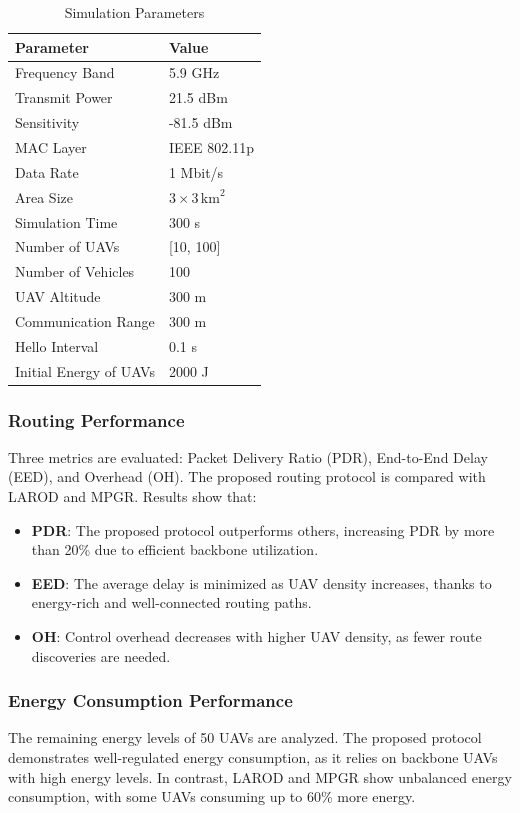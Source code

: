 \begin{table}[H]
    \centering
    \caption{Simulation Parameters}
    \label{tab:sim_params}
    \begin{tabular}{|l|l|}
        \hline
        \textbf{Parameter} & \textbf{Value} \\
        \hline
        Frequency Band & 5.9 GHz \\
        Transmit Power & 21.5 dBm \\
        Sensitivity & -81.5 dBm \\
        MAC Layer & IEEE 802.11p \\
        Data Rate & 1 Mbit/s \\
        Area Size & \(3 \times 3 \, \text{km}^2\) \\
        Simulation Time & 300 s \\
        Number of UAVs & [10, 100] \\
        Number of Vehicles & 100 \\
        UAV Altitude & 300 m \\
        Communication Range & 300 m \\
        Hello Interval & 0.1 s \\
        Initial Energy of UAVs & 2000 J \\
        \hline
    \end{tabular}
\end{table}

\subsubsection{Routing Performance}
Three metrics are evaluated: Packet Delivery Ratio (PDR), End-to-End Delay (EED), and Overhead (OH). The proposed routing protocol is compared with LAROD and MPGR. Results show that:
\begin{itemize}
    \item \textbf{PDR}: The proposed protocol outperforms others, increasing PDR by more than 20\% due to efficient backbone utilization.
    \item \textbf{EED}: The average delay is minimized as UAV density increases, thanks to energy-rich and well-connected routing paths.
    \item \textbf{OH}: Control overhead decreases with higher UAV density, as fewer route discoveries are needed.
\end{itemize}

\subsubsection{Energy Consumption Performance}
The remaining energy levels of 50 UAVs are analyzed. The proposed protocol demonstrates well-regulated energy consumption, as it relies on backbone UAVs with high energy levels. In contrast, LAROD and MPGR show unbalanced energy consumption, with some UAVs consuming up to 60\% more energy.

